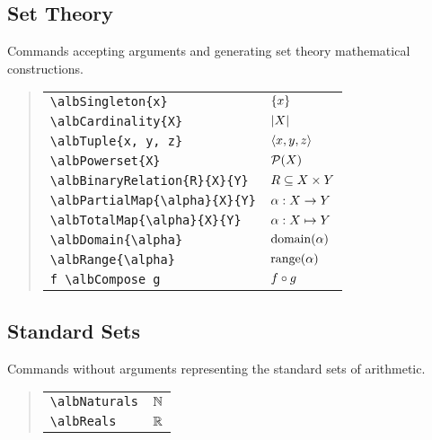 \documentclass[11pt,a4paper,oneside]{alb-latex}
\begin{document}
\subsection{Set Theory}
\label{sec:alb-order-theory-documentation:set-theory}

Commands accepting arguments and generating set theory mathematical
constructions.

\begin{quote}
  \begin{tabular}{p{}@{\qquad}p{}}
    \verb$\albSingleton{x}$ & $\left\{ x \right\}$ \\
    \verb$\albCardinality{X}$ & $\left| X \right|$ \\
    \verb$\albTuple{x, y, z}$ & $\albTuple{x, y, z}$ \\
    \verb$\albPowerset{X}$ & $\mathcal{P}(X)$ \\
    \verb$\albBinaryRelation{R}{X}{Y}$ & $\albBinaryRelation{R}{X}{Y}$ \\
    \verb$\albPartialMap{\alpha}{X}{Y}$ %
    & $\albPartialMap{\alpha}{X}{Y}$ \\
    \verb$\albTotalMap{\alpha}{X}{Y}$ %
    & $\albTotalMap{\alpha}{X}{Y}$ \\
    \verb$\albDomain{\alpha}$ & $\operatorname{domain}(\alpha)$ \\
    \verb$\albRange{\alpha}$ & $\operatorname{range}(\alpha)$ \\
    \verb$f \albCompose g$ & $f \circ g$
  \end{tabular}
\end{quote}



\subsection{Standard Sets}
\label{sec:alb-order-theory-documentation:stand-sets}

Commands without arguments representing the standard sets of arithmetic.

\begin{quote}
  \begin{tabular}{p{}@{\qquad}p{}}
    \verb$\albNaturals$ & $\albNaturals$ \\
    \verb$\albReals$ & $\albReals$
  \end{tabular}
\end{quote}
\end{document}
